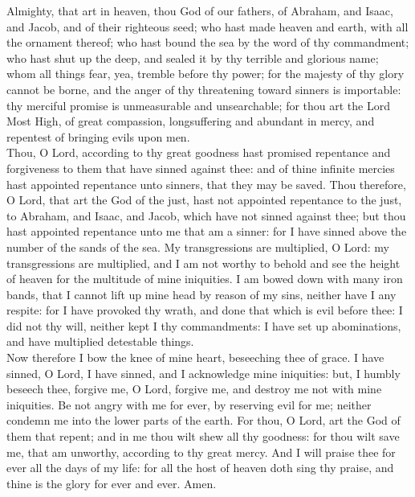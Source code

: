 \fancyhead[RO,LE]{}
\fancyhead[RE,LO]{}

 Almighty, that art in heaven, thou God of our fathers, of Abraham, and Isaac, and Jacob, and of their righteous seed; who hast made heaven and earth, with all the ornament thereof; who hast bound the sea by the word of thy commandment; who hast shut up the deep, and sealed it by thy terrible and glorious name; whom all things fear, yea, tremble before thy power; for the majesty of thy glory cannot be borne, and the anger of thy threatening toward sinners is importable: thy merciful promise is unmeasurable and unsearchable; for thou art the Lord Most High, of great compassion, longsuffering and abundant in mercy, and repentest of bringing evils upon men.\\

Thou, O Lord, according to thy great goodness hast promised repentance and forgiveness to them that have sinned against thee: and of thine infinite mercies hast appointed repentance unto sinners, that they may be saved. Thou therefore, O Lord, that art the God of the just, hast not appointed repentance to the just, to Abraham, and Isaac, and Jacob, which have not sinned against thee; but thou hast appointed repentance unto me that am a sinner: for I have sinned above the number of the sands of the sea. My transgressions are multiplied, O Lord: my transgressions are multiplied, and I am not worthy to behold and see the height of heaven for the multitude of mine iniquities. I am bowed down with many iron bands, that I cannot lift up mine head by reason of my sins, neither have I any respite: for I have provoked thy wrath, and done that which is evil before thee: I did not thy will, neither kept I thy commandments: I have set up abominations, and have multiplied detestable things.\\

Now therefore I bow the knee of mine heart, beseeching thee of grace. I have sinned, O Lord, I have sinned, and I acknowledge mine iniquities: but, I humbly beseech thee, forgive me, O Lord, forgive me, and destroy me not with mine iniquities. Be not angry with me for ever, by reserving evil for me; neither condemn me into the lower parts of the earth. For thou, O Lord, art the God of them that repent; and in me thou wilt shew all thy goodness: for thou wilt save me, that am unworthy, according to thy great mercy. And I will praise thee for ever all the days of my life: for all the host of heaven doth sing thy praise, and thine is the glory for ever and ever. Amen.